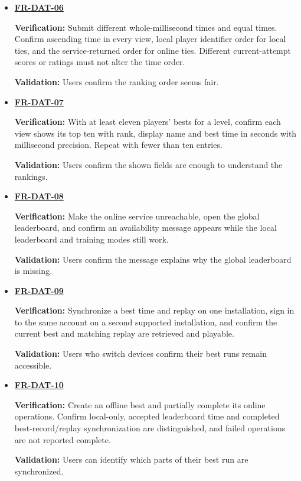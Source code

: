 \documentclass[12pt]{article}
\begin{document}
\begin{itemize}
 global board retains one accepted best per player and the friends view
 contains only the signed-in player and accepted friends. A pending request
 or unrelated player must not appear; an empty friend list shows only self
 if the player has an entry. Confirm friends positions are numbered within
 that group rather than copied from global ranks.\par
 \textbf{Validation:} Users confirm global and friends views compare the intended players.
\item \hyperlink{req:FR-DAT-06}{\textbf{FR-DAT-06}}\par
 \textbf{Verification:} Submit different whole-millisecond times and equal
 times. Confirm ascending time in every view, local player identifier order
 for local ties, and the service-returned order for online ties. Different
 current-attempt scores or ratings must not alter the time order.\par
 \textbf{Validation:} Users confirm the ranking order seems fair.
\item \hyperlink{req:FR-DAT-07}{\textbf{FR-DAT-07}}\par
 \textbf{Verification:} With at least eleven players' bests for a level, confirm
 each view shows its top ten with rank, display name and best time in seconds
 with millisecond precision. Repeat with fewer than ten entries.\par
 \textbf{Validation:} Users confirm the shown fields are enough to understand
 the rankings.
\item \hyperlink{req:FR-DAT-08}{\textbf{FR-DAT-08}}\par
 \textbf{Verification:} Make the online service unreachable, open the global
 leaderboard, and confirm an availability message appears while the local
 leaderboard and training modes still work.\par
 \textbf{Validation:} Users confirm the message explains why the global
 leaderboard is missing.
\item \hyperlink{req:FR-DAT-09}{\textbf{FR-DAT-09}}\par
 \textbf{Verification:} Synchronize a best time and replay on one installation,
 sign in to the same account on a second supported installation, and confirm
 the current best and matching replay are retrieved and playable.\par
 \textbf{Validation:} Users who switch devices confirm their best runs remain accessible.
\item \hyperlink{req:FR-DAT-10}{\textbf{FR-DAT-10}}\par
 \textbf{Verification:} Create an offline best and partially complete its online
 operations. Confirm local-only, accepted leaderboard time and completed
 best-record/replay synchronization are distinguished, and failed operations
 are not reported complete.\par
 \textbf{Validation:} Users can identify which parts of their best run are synchronized.
\end{itemize}
\end{document}
